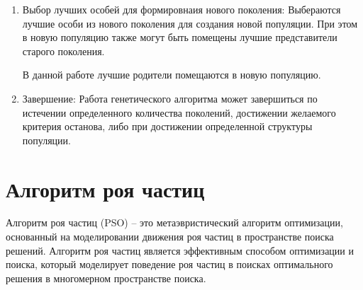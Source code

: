 \documentclass[12pt]{report}
\begin{document}
\begin{enumerate}
   \item Выбор лучших особей для формировнаия нового поколения:
   Выбераются лучшие особи из нового поколения для создания новой популяции. 
   При этом в новую популяцию также могут быть помещены лучшие представители старого поколения. 
   
   В данной работе лучшие родители помещаются в новую популяцию.
   
   \item Завершение:
   Работа генетического алгоритма может завершиться по истечении определенного количества поколений, достижении желаемого критерия останова, либо при достижении определенной структуры популяции.
\end{enumerate}

\section{Алгоритм роя частиц}
Алгоритм роя частиц (PSO) -- это метаэвристический алгоритм оптимизации, основанный на моделировании движения роя частиц в пространстве поиска решений. 
Алгоритм роя частиц является эффективным способом оптимизации и поиска, который моделирует поведение роя частиц в поисках оптимального решения в многомерном пространстве поиска.
\end{document}
